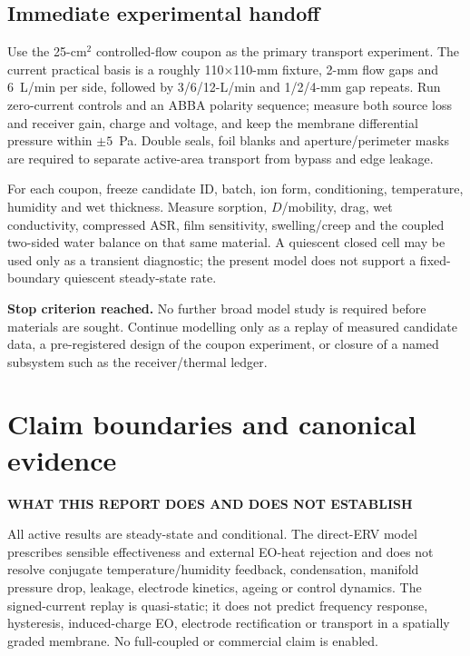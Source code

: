 \documentclass[10pt,a4paper]{article}
\newcommand{\eyebrow}[1]{{\sffamily\bfseries\small\color{Teal}\MakeUppercase{#1}}}
\begin{document}
\subsection{Immediate experimental handoff}

Use the 25-cm$^2$ controlled-flow coupon as the primary transport experiment.
The current practical basis is a roughly 110$\times$110-mm fixture,
2-mm flow gaps and 6~L/min per side, followed by 3/6/12-L/min and
1/2/4-mm gap repeats. Run zero-current controls and an ABBA polarity sequence;
measure both source loss and receiver gain, charge and voltage, and keep the
membrane differential pressure within $\pm5$~Pa. Double seals, foil blanks and
aperture/perimeter masks are required to separate active-area transport from
bypass and edge leakage.

For each coupon, freeze candidate ID, batch, ion form, conditioning, temperature,
humidity and wet thickness. Measure sorption, $D$/mobility, drag, wet
conductivity, compressed ASR, film sensitivity, swelling/creep and the coupled
two-sided water balance on that same material. A quiescent closed cell may be
used only as a transient diagnostic; the present model does not support a
fixed-boundary quiescent steady-state rate.

\begin{mainbox}
\textbf{Stop criterion reached.} No further broad model study is required
before materials are sought. Continue modelling only as a replay of measured
candidate data, a pre-registered design of the coupon experiment, or closure
of a named subsystem such as the receiver/thermal ledger.
\end{mainbox}

\section{Claim boundaries and canonical evidence}
\eyebrow{What this report does and does not establish}

All active results are steady-state and conditional. The direct-ERV model
prescribes sensible effectiveness and external EO-heat rejection and does not
resolve conjugate temperature/humidity feedback, condensation, manifold
pressure drop, leakage, electrode kinetics, ageing or control dynamics. The
signed-current replay is quasi-static; it does not predict frequency response,
hysteresis, induced-charge EO, electrode rectification or transport in a
spatially graded membrane. No full-coupled or commercial claim is enabled.
\end{document}
